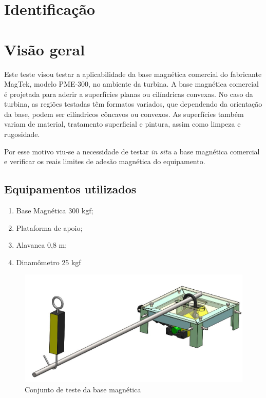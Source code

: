 \documentclass[12pt,a4paper]{article}
\begin{document}



\newpage%
\section{Identificação}



\newpage%
\section{Visão geral}
Este teste visou testar a aplicabilidade da base magnética comercial do
fabricante MagTek, modelo PME-300, no ambiente da turbina. A base magnética
comercial é projetada para aderir a superfícies planas ou cilíndricas convexas.
No caso da turbina, as regiões testadas têm formatos variados, que dependendo da
orientação da base, podem ser cilíndricos côncavos ou convexos. As
superfícies também variam de material, tratamento superficial e pintura,
assim como limpeza e rugosidade.

Por esse motivo viu-se a necessidade de testar
\textit{in situ} a base magnética comercial e verificar os reais limites de
adesão magnética do equipamento.


\subsection{Equipamentos utilizados}
\begin{enumerate}
  \item Base Magnética 300 kgf;
  \item Plataforma de apoio;
  \item Alavanca 0,8 m;
  \item Dinamômetro 25 kgf
\end{enumerate} 

\begin{figure}[h!]
\centering
	\includegraphics[width=0.9\columnwidth]{figs/conjunto_01.jpg}
	\caption{Conjunto de teste da base magnética}
	\label{fig::conjunto}
\end{figure}
\end{document}
